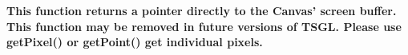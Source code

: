 
\begin{DoxyRefList}
\item[\label{deprecated__deprecated000001}%
\hypertarget{deprecated__deprecated000001}{}%
Member \hyperlink{classtsgl_1_1_canvas_a71f072dd82ca3b5cecfd65cde6d8a226}{tsgl\-:\-:Canvas\-:\-:get\-Screen\-Buffer} ()]{\bfseries This function returns a pointer directly to the Canvas' screen buffer. This function may be removed in future versions of T\-S\-G\-L. Please use get\-Pixel() or get\-Point() get individual pixels. }
\end{DoxyRefList}